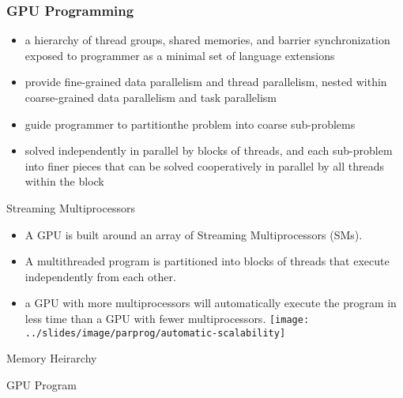 \documentclass[10pt,t]{beamer}
\begin{document}
\begin{frame}
  \frametitle{GPU Programming}
  \begin{itemize}
  \item a hierarchy of thread groups, shared memories, and barrier synchronization exposed to programmer as a minimal set of language extensions
  \item provide fine-grained data parallelism and thread parallelism, nested within coarse-grained data parallelism and task parallelism
  \item guide programmer to partitionthe problem into coarse sub-problems 
  \item solved independently in parallel by blocks of threads, and each sub-problem into finer pieces that can be solved cooperatively in parallel by all threads within the block
  \end{itemize}
\end{frame}

\begin{frame}{Streaming Multiprocessors}
  \begin{itemize}
  \item A GPU is built around an array of Streaming Multiprocessors (SMs). 
  \item A multithreaded program is partitioned into blocks of threads that execute independently from each other. 
  \item a GPU with more multiprocessors will automatically execute the program in less time than a GPU with fewer multiprocessors.
    \texttt{[image: ../slides/image/parprog/automatic-scalability]}
  \end{itemize}
\end{frame}

\begin{frame}{Memory Heirarchy}
\end{frame}

\begin{frame}{GPU Program}
\end{frame}
\end{document}
